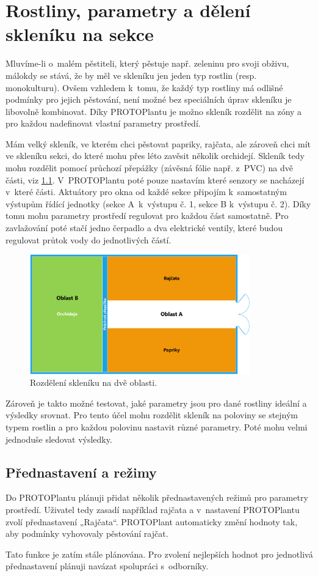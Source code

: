 \chapter{Rostliny, parametry a dělení skleníku na sekce}
Mluvíme-li o~malém pěstiteli, který pěstuje např. zeleninu pro svoji obživu, málokdy se stává, že by měl ve skleníku jen jeden typ rostlin (resp. monokulturu).
Ovšem vzhledem k~tomu, že každý typ rostliny má odlišné podmínky pro jejich pěstování, není možné bez speciálních úprav skleníku je libovolně kombinovat.
Díky PROTOPlantu je možno skleník rozdělit na zóny a pro každou nadefinovat vlastní parametry prostředí.
\newline

\noindent{}

Mám velký skleník, ve kterém chci pěstovat papriky, rajčata, ale zároveň chci mít ve skleníku sekci, do které mohu přes léto zavěsit několik orchidejí.
Skleník tedy mohu rozdělit pomocí průchozí přepážky (závěsná fólie např. z~PVC) na dvě části, viz \ref{fig:separationA}.
V~PROTOPlantu poté pouze nastavím které senzory se nacházejí v~které části.
Aktuátory pro okna od každé sekce připojím k~samostatným výstupům řídící jednotky (sekce A~k~výstupu č. 1, sekce B k~výstupu č. 2).
Díky tomu mohu parametry prostředí regulovat pro každou část samostatně.
Pro zavlažování poté stačí jedno čerpadlo a dva elektrické ventily, které budou regulovat průtok vody do jednotlivých částí.
\begin{figure}[htbp]
    \centering
    \includegraphics[width=0.85\textwidth]{img/Rozdeleni_Skleniku_A.png}
    \caption{Rozdělení skleníku na dvě oblasti.}
    \label{fig:separationA}
\end{figure}

Zároveň je takto možné testovat, jaké parametry jsou pro dané rostliny ideální a výsledky srovnat.
Pro tento účel mohu rozdělit skleník na poloviny se stejným typem rostlin a pro každou polovinu nastavit různé parametry.
Poté mohu velmi jednoduše sledovat výsledky.

\section{Přednastavení a režimy}
Do PROTOPlantu plánuji přidat několik přednastavených režimů pro parametry prostředí.
Uživatel tedy zasadí například rajčata a v~nastavení PROTOPlantu zvolí přednastavení „Rajčata“.
PROTOPlant automaticky změní hodnoty tak, aby podmínky vyhovovaly pěstování rajčat.

Tato funkce je zatím stále plánována.
Pro zvolení nejlepších hodnot pro jednotlivá přednastavení plánuji navázat spolupráci s~odborníky.

\newpage